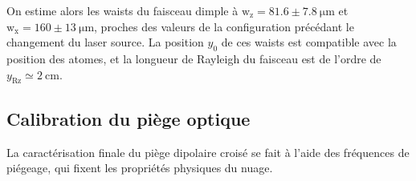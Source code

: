 On estime alors les waists du faisceau dimple à $\mathrm{w_z}=81.6\pm\SI{7.8}{\micro\metre}$ et $\mathrm{w_x}=160\pm \SI{13}{\micro\metre}$, proches des valeurs de la configuration précédant le changement du laser source. La position $y_0$ de ces waists est compatible avec la position des atomes, et la longueur de Rayleigh du faisceau est de l'ordre de $y_{\mathrm{Rz}}\simeq \SI{2}{\centi\metre}$.



\subsection{Calibration du piège optique}
\label{sc:calibration_piege_optique}

La caractérisation finale du piège dipolaire croisé se fait à l'aide des fréquences de piégeage, qui fixent les propriétés physiques du nuage. %


